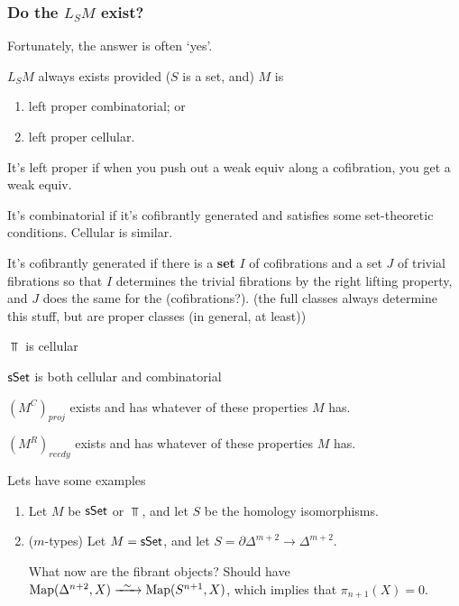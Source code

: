 \begin{AlexandreBousfieldLocalisation}
\subsubsection*{Do the $L_SM$ exist?}
Fortunately, the answer is often `yes'.
\begin{thm*}
$L_SM$ always exists provided ($S$ is a set, and) $M$ is
\begin{enumerate}\squishlist
\item left proper combinatorial; or
\item left proper cellular.
\end{enumerate}
\end{thm*}
\begin{defn*}
It's left proper if when you push out a weak equiv along a cofibration, you get a weak equiv.
\end{defn*}
\begin{defn*}
It's combinatorial if it's cofibrantly generated and satisfies some set-theoretic conditions. Cellular is similar.
\end{defn*}
\begin{defn*}
It's cofibrantly generated if there is a \textbf{set} $I$ of cofibrations and a set $J$ of trivial fibrations so that $I$ determines the trivial fibrations by the right lifting property, and $J$ does the same for the (cofibrations?). (the full classes always determine this stuff, but are proper classes (in general, at least))
\end{defn*}
\begin{exmp*}
\begin{itemise}
\item $\Top$ is cellular
\item $\operatorname{{\mathsf{sSet}}}$ is both cellular and combinatorial
\item $(M^C)_{proj}$ exists and has whatever of these properties $M$ has. 
\item $(M^R)_{reedy}$ exists and has whatever of these properties $M$ has.
\end{itemise}
\end{exmp*}
Lets have some examples
\begin{enumerate}
\item Let $M$ be $\operatorname{{\mathsf{sSet}}}$ or $\Top$, and let $S$ be the homology isomorphisms.
\item ($m$-types) Let $M=\operatorname{{\mathsf{sSet}}}$, and let $S=\partial\Delta^{m+2}\to \Delta^{m+2}$.

What now are the fibrant objects? Should have $\Map(\Delta^{n+2},X)\weakequiv\Map(S^{n+1},X)$, which implies that $\pi_{n+1}(X)=0$.


\end{enumerate}
\end{AlexandreBousfieldLocalisation}
